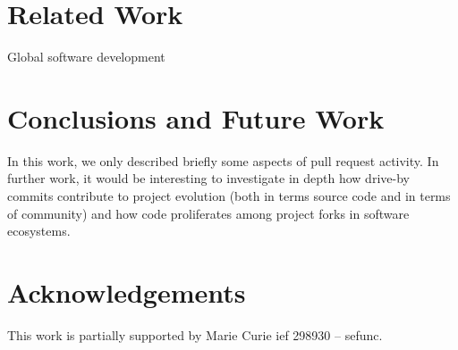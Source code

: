 \documentclass{sig-alternate}
\begin{document}
\section{Related Work}

\cite{Bird09}
\cite{Cornf10}
\cite{Dabbi12}
\cite{Bird12}
\cite{Barr12}
\cite{Buffe99}
\cite{Mens02}
\cite{Shiha12}

Global software development
\section{Conclusions and Future Work}

In this work, we only described briefly some aspects of pull request activity.
In further work, it would be interesting to investigate in depth how drive-by
commits contribute to project evolution (both in terms source code and in
terms of community) and how code proliferates among project
forks in software ecosystems.

\section*{Acknowledgements}

This work is partially supported by Marie Curie {\sc ief} 298930 -- {\sc sefunc}.



\end{document}
